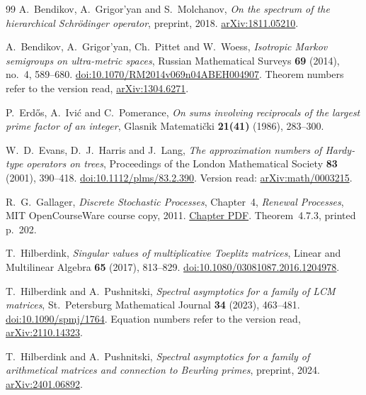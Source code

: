 \begin{thebibliography}{99}
A.~Bendikov, A.~Grigor'yan and S.~Molchanov,
\emph{On the spectrum of the hierarchical Schr\"odinger operator},
preprint, 2018.
\href{https://arxiv.org/abs/1811.05210}{arXiv:1811.05210}.

A.~Bendikov, A.~Grigor'yan, Ch.~Pittet and W.~Woess,
\emph{Isotropic Markov semigroups on ultra-metric spaces},
Russian Mathematical Surveys \textbf{69} (2014), no.~4, 589--680.
\href{https://doi.org/10.1070/RM2014v069n04ABEH004907}{doi:10.1070/RM2014v069n04ABEH004907}.
Theorem numbers refer to the version read,
\href{https://arxiv.org/abs/1304.6271}{arXiv:1304.6271}.

P.~Erd\H{o}s, A.~Ivi\'c and C.~Pomerance,
\emph{On sums involving reciprocals of the largest prime factor of an
integer}, Glasnik Matemati\v{c}ki \textbf{21(41)} (1986), 283--300.

W.~D.~Evans, D.~J.~Harris and J.~Lang,
\emph{The approximation numbers of Hardy-type operators on trees},
Proceedings of the London Mathematical Society \textbf{83} (2001), 390--418.
\href{https://doi.org/10.1112/plms/83.2.390}{doi:10.1112/plms/83.2.390}.
Version read: \href{https://arxiv.org/abs/math/0003215}{arXiv:math/0003215}.

R.~G.~Gallager,
\emph{Discrete Stochastic Processes}, Chapter~4, \emph{Renewal Processes},
MIT OpenCourseWare course copy, 2011.
\href{https://ocw.mit.edu/courses/6-262-discrete-stochastic-processes-spring-2011/931ffa0940899c27f34b71ad64fd2bb0_MIT6_262S11_chap04.pdf}{Chapter PDF}.
Theorem~4.7.3, printed p.~202.

T.~Hilberdink,
\emph{Singular values of multiplicative Toeplitz matrices},
Linear and Multilinear Algebra \textbf{65} (2017), 813--829.
\href{https://doi.org/10.1080/03081087.2016.1204978}{doi:10.1080/03081087.2016.1204978}.

T.~Hilberdink and A.~Pushnitski,
\emph{Spectral asymptotics for a family of LCM matrices},
St.\ Petersburg Mathematical Journal \textbf{34} (2023), 463--481.
\href{https://doi.org/10.1090/spmj/1764}{doi:10.1090/spmj/1764}.
Equation numbers refer to the version read,
\href{https://arxiv.org/abs/2110.14323}{arXiv:2110.14323}.

T.~Hilberdink and A.~Pushnitski,
\emph{Spectral asymptotics for a family of arithmetical matrices and
connection to Beurling primes}, preprint, 2024.
\href{https://arxiv.org/abs/2401.06892}{arXiv:2401.06892}.


\end{thebibliography}
